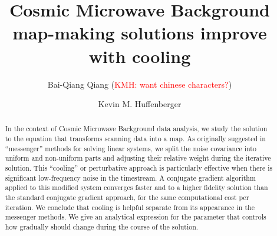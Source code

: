 \documentclass[twocolumn,linenumbers]{aastex631}
\newcommand{\kmh}[1]{\textcolor{red}{KMH: #1}}
\begin{document}
\title{Cosmic Microwave Background map-making solutions improve with cooling}


  \author{Bai-Qiang Qiang (\kmh{want chinese characters?})} %

\author[0000-0001-7109-0099]{Kevin M. Huffenberger}

 
\begin{abstract}

  In the context of Cosmic Microwave Background data analysis, we study the solution to the equation that transforms scanning data into a map.  As originally suggested in ``messenger'' methods for solving linear systems, we split the  noise covariance into uniform and non-uniform parts and adjusting their relative weight during the iterative solution.  This ``cooling'' or perturbative approach is particularly effective when there is significant low-frequency noise in the timestream.  A conjugate gradient algorithm applied to this modified system converges faster and to a higher fidelity solution than the standard conjugate gradient approach, for the same computational cost per iteration.  We conclude that cooling is helpful separate from its appearance in the messenger methods.
%
We give an analytical expression for the parameter that controls how gradually should change during the course of the solution. 

\end{abstract}

\end{document}
